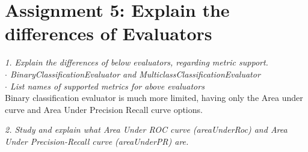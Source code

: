\documentclass[]{article}
\begin{document}
\section*{Assignment 5: Explain the differences of Evaluators}
\emph{1. Explain the differences of below evaluators, regarding metric support. } \\
\emph{$\cdot$ BinaryClassificationEvaluator and MulticlassClassificationEvaluator} \\
\emph{$\cdot$ List names of supported metrics for above evaluators} \\



Binary classification evaluator is much more limited, having only the Area under curve and Area Under Precision Recall curve options.

\emph{2. Study and explain what Area Under ROC curve (areaUnderRoc) and Area Under Precision-Recall curve (areaUnderPR) are. }
\end{document}

